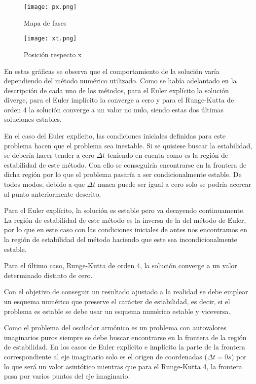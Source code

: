 \documentclass{article}
\begin{document}
	\begin{figure}[h!]
		\begin{center}
			\texttt{[image: px.png]}
			\caption{Mapa de fases}
		\end{center}
	\end{figure}

	\newpage
	
	\begin{figure}[h!]
		\begin{center}
			\texttt{[image: xt.png]}
			\caption{Posición respecto x}
		\end{center}
	\end{figure}

	En estas gráficas se observa que el comportamiento de la solución varía dependiendo del método numérico utilizado. Como se había adelantado en la descripción de cada uno de los métodos, para el Euler explícito la solución diverge, para el Euler implícito la converge a cero y para el Runge-Kutta de orden 4 la solución converge a un valor no nulo, siendo estas dos últimas soluciones estables.
	
	En el caso del Euler explícito, las condiciones iniciales definidas para este problema hacen que el problema sea inestable. Si se quisiese buscar la estabilidad, se debería hacer tender a cero $\Delta t$ teniendo en cuenta como es la región de estabilidad de este método. Con ello se conseguiría encontrarse en la frontera de dicha región por lo que el problema pasaría a ser condicionalmente estable. De todos modos, debido a que $\Delta t$ nunca puede ser igual a cero solo se podría acercar al punto anteriormente descrito.
	
	Para el Euler explícito, la solución es estable pero va decayendo continuamente. La región de estabilidad de este método es la inversa de la del método de Euler, por lo que en este caso con las condiciones iniciales de antes nos encontramos en la región de estabilidad del método haciendo que este sea incondicionalmente estable.
	
	Para el último caso, Runge-Kutta de orden 4, la solución converge a un valor determinado distinto de cero.
	
	Con el objetivo de conseguir un resultado ajustado a la realidad se debe emplear un esquema numérico que preserve el carácter de estabilidad, es decir, si el problema es estable se debe usar un esquema numérico estable y viceversa.
	
	Como el problema del oscilador armónico es un problema con autovalores imaginarios puros siempre se debe buscar encontrarse en la frontera de la región de estabilidad. En los casos de Euler explícito e implícito la parte de la frontera correspondiente al eje imaginario solo es el origen de coordenadas ($\Delta t=0s$) por lo que será un valor asintótico mientras que para el Runge-Kutta 4, la frontera pasa por varios puntos del eje imaginario.
	
\end{document}
